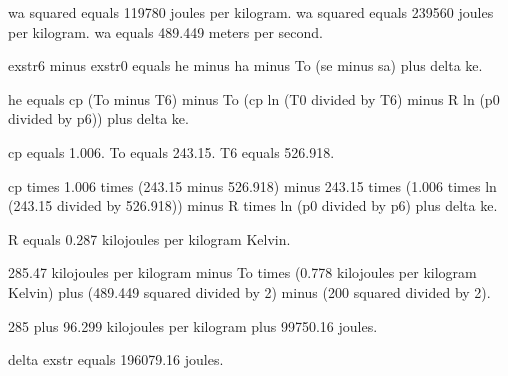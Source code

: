 wa squared equals 119780 joules per kilogram.  
wa squared equals 239560 joules per kilogram.  
wa equals 489.449 meters per second.  

exstr6 minus exstr0 equals he minus ha minus To (se minus sa) plus delta ke.  

he equals cp (To minus T6) minus To (cp ln (T0 divided by T6) minus R ln (p0 divided by p6)) plus delta ke.  

cp equals 1.006.  
To equals 243.15.  
T6 equals 526.918.  

cp times 1.006 times (243.15 minus 526.918) minus 243.15 times (1.006 times ln (243.15 divided by 526.918)) minus R times ln (p0 divided by p6) plus delta ke.  

R equals 0.287 kilojoules per kilogram Kelvin.  

285.47 kilojoules per kilogram minus To times (0.778 kilojoules per kilogram Kelvin) plus (489.449 squared divided by 2) minus (200 squared divided by 2).  

285 plus 96.299 kilojoules per kilogram plus 99750.16 joules.  

delta exstr equals 196079.16 joules.